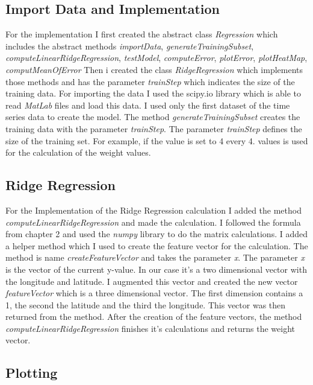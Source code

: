 \documentclass[10pt, a4paper, twocolumn]{article} %
\begin{document}
\subsection{Import Data and Implementation}
For the implementation I first created the abstract class \textit{Regression} which includes the abstract methods \textit{importData}, \textit{generateTrainingSubset}, \textit{computeLinearRidgeRegression}, \textit{testModel}, 
\textit{computeError}, \textit{plotError}, \textit{plotHeatMap}, \textit{computMeanOfError}
Then i created the class \textit{RidgeRegression} which implements those methods and has the parameter \textit{trainStep} which indicates the size of the training data. For importing the data I used the scipy.io library which is able to read \textit{MatLab} files and load this data. I used only the first dataset of the time series data to create the model. The method \textit{generateTrainingSubset} creates the training data with the parameter \textit{trainStep}. The parameter \textit{trainStep} defines the size of the training set. For example, if the value is set to 4 every 4. values is used for the calculation of the weight values. 

\subsection{Ridge Regression}
For the Implementation of the Ridge Regression calculation I added the method \textit{computeLinearRidgeRegression} and made the calculation. I followed the formula from chapter 2 and used the \textit{numpy} library to do the matrix calculations. I added a helper method which I used to create the feature vector for the calculation. The method is name \textit{createFeatureVector} and takes the parameter \textit{x}. The parameter \textit{x} is the vector of the current y-value. In our case it's a two dimensional vector with the longitude and latitude. I augmented this vector and created the new vector \textit{featureVector} which is a three dimensional vector. The first dimension contains a 1, the second the latitude and the third the longitude. This vector was then returned from the method. After the creation of the feature vectors, the method \textit{computeLinearRidgeRegression} finishes it's calculations and returns the weight vector.  

\subsection{Plotting}
\end{document}

